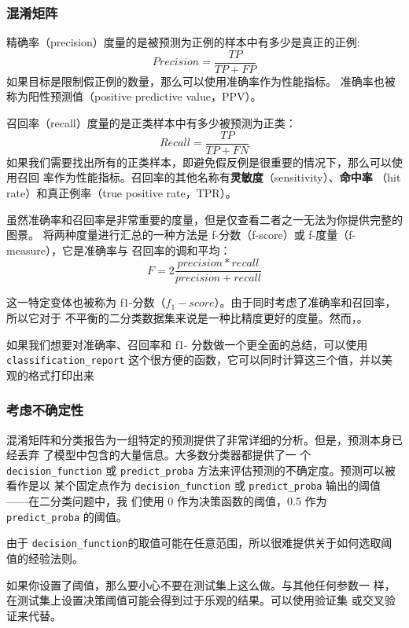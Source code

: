 \subsubsection{混淆矩阵}

精确率（precision）度量的是被预测为正例的样本中有多少是真正的正例:
\begin{equation*}
    Precision = \frac{TP}{TP+FP}
\end{equation*}
如果目标是限制假正例的数量，那么可以使用准确率作为性能指标。
准确率也被称为阳性预测值（positive
predictive value，PPV）。

召回率（recall）度量的是正类样本中有多少被预测为正类：
\begin{equation*}
    Recall = \frac{TP}{TP+FN}
\end{equation*}
如果我们需要找出所有的正类样本，即避免假反例是很重要的情况下，那么可以使用召回
率作为性能指标。召回率的其他名称有\textbf{灵敏度}（sensitivity）、\textbf{命中率}
（hit rate）和真正例率（true positive rate，TPR）。

虽然准确率和召回率是非常重要的度量，但是仅查看二者之一无法为你提供完整的图景。
将两种度量进行汇总的一种方法是 f-分数（f-score）或 f-度量（f-measure），它是准确率与
召回率的调和平均：
\begin{equation*}
    F = 2\frac{precision*recall}{precision + recall}
\end{equation*}

这一特定变体也被称为 f1-分数（$f_1-score$）。由于同时考虑了准确率和召回率，所以它对于
不平衡的二分类数据集来说是一种比精度更好的度量。然而，。

如果我们想要对准确率、召回率和 f1- 分数做一个更全面的总结，可以使用 \verb|classification_report| 这个很方便的函数，它可以同时计算这三个值，并以美观的格式打印出来
\subsubsection{考虑不确定性}
混淆矩阵和分类报告为一组特定的预测提供了非常详细的分析。但是，预测本身已经丢弃
了模型中包含的大量信息。大多数分类器都提供了一
个 \verb|decision_function| 或 \verb|predict_proba| 方法来评估预测的不确定度。预测可以被看作是以
某个固定点作为 \verb|decision_function| 或 \verb|predict_proba| 输出的阈值——在二分类问题中，我
们使用 0 作为决策函数的阈值，0.5 作为 \verb|predict_proba| 的阈值。

由于 \verb|decision_function|的取值可能在任意范围，所以很难提供关于如何选取阈值的经验法则。

\begin{tcolorbox}
    如果你设置了阈值，那么要小心不要在测试集上这么做。与其他任何参数一
    样，在测试集上设置决策阈值可能会得到过于乐观的结果。可以使用验证集
    或交叉验证来代替。
\end{tcolorbox}

